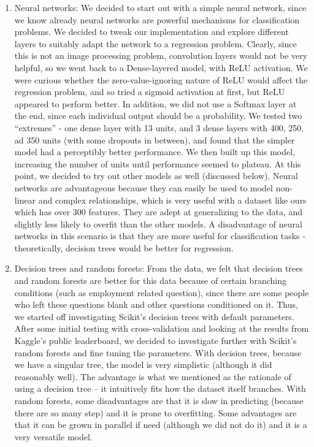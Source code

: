 \begin{enumerate}
\item Neural networks: We decided to start out with a simple neural network, since we know already neural networks are powerful mechanisms for classification problems. We decided to tweak our implementation and explore different layers to suitably adapt the network to a regression problem. Clearly, since this is not an image processing problem, convolution layers would not be very helpful, so we went back to a Dense-layered model, with ReLU activation. We were curious whether the zero-value-ignoring nature of ReLU would affect the regression problem, and so tried a sigmoid activation at first, but ReLU appeared to perform better. In addition, we did not use a Softmax layer at the end, since each individual output should be a probability. We tested two “extremes” - one dense layer with 13 units, and 3 dense layers with 400, 250, ad 350 units (with some dropouts in between), and found that the simpler model had a perceptibly better performance. We then built up this model, increasing the number of units until performance seemed to plateau. At this point, we decided to try out other models as well (discussed below). Neural networks are advantageous because they can easily be used to model non-linear and complex relationships, which is very useful with a dataset like ours which has over 300 features. They are adept at generalizing to the data, and slightly less likely to overfit than the other models. A disadvantage of neural networks in this scenario is that they are more useful for classification tasks - theoretically, decision trees would be better for regression.

\item Decision trees and random forests: From the data, we felt that decision trees and random forests are better for this data because of certain branching conditions (such as employment related question), since there are some people who left these questions blank and other questions conditioned on it. Thus, we started off investigating Scikit’s decision trees with default parameters. After some initial testing with cross-validation and looking at the results from Kaggle’s public leaderboard, we decided to investigate further with Scikit’s random forests and fine tuning the parameters. With decision trees, because we have a singular tree, the model is very simplistic (although it did reasonably well). The advantage is what we mentioned as the rationale of using a decision tree -- it intuitively fits how the dataset itself branches. With random forests, some disadvantages are that it is slow in predicting (because there are so many step) and it is prone to overfitting. Some advantages are that it can be grown in parallel if need (although we did not do it) and it is a very versatile model. 


\end{enumerate}
